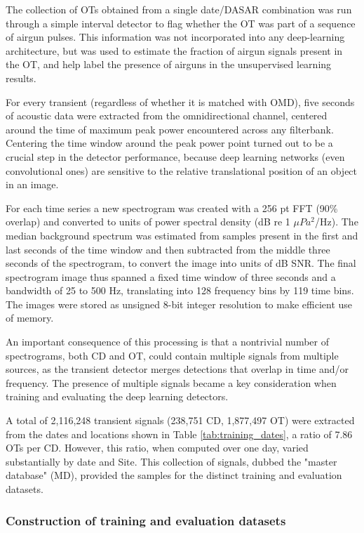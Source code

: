 \documentclass[preprint,NumberedRefs]{JASAnew}
\begin{document}
The collection of OTs obtained from a single date/DASAR combination was run through a simple interval detector\cite{guerra2011quantifying} to flag whether the OT was part of a sequence of airgun pulses.  This information was not incorporated into any deep-learning architecture, but was used to estimate the fraction of airgun signals present in the OT, and help label the presence of airguns in the unsupervised learning results.

For every transient (regardless of whether it is matched with OMD), five seconds of acoustic data were extracted from the omnidirectional channel, centered around the time of maximum peak power encountered across any filterbank.  Centering the time window around the peak power point turned out to be a crucial step in the detector performance, because deep learning networks (even convolutional ones) are sensitive to the relative translational position of an object in an image.  

For each time series a new spectrogram was created with a 256 pt FFT (90\% overlap) and converted to units of power spectral density (dB re 1 $\mu Pa^2$/Hz).  The median background spectrum was estimated from samples present in the first and last seconds of the time window and then subtracted from the middle three seconds of the spectrogram, to convert the image into units of dB SNR.  The final spectrogram image thus spanned a fixed time window of three seconds and a bandwidth of 25 to 500 Hz, translating into 128 frequency bins by 119 time bins.  The images were stored as unsigned 8-bit integer resolution to make efficient use of memory.

An important consequence of this processing is that a nontrivial number of spectrograms, both CD and OT, could contain multiple signals from multiple sources, as the transient detector merges detections that overlap in time and/or frequency.  The presence of multiple signals became a key consideration when training and evaluating the deep learning detectors.

A total of 2,116,248 transient signals (238,751 CD, 1,877,497 OT) were extracted from the dates and locations shown in Table \ref{tab:training_dates}, a ratio of 7.86 OTs  per CD.  However, this ratio, when computed over one day, varied substantially by date and Site.  This collection of signals, dubbed the "master database" (MD), provided the samples for the distinct training and evaluation datasets.

\subsubsection{Construction of training and evaluation datasets}
\label{sec:ConstructionTrainEval}
\end{document}
